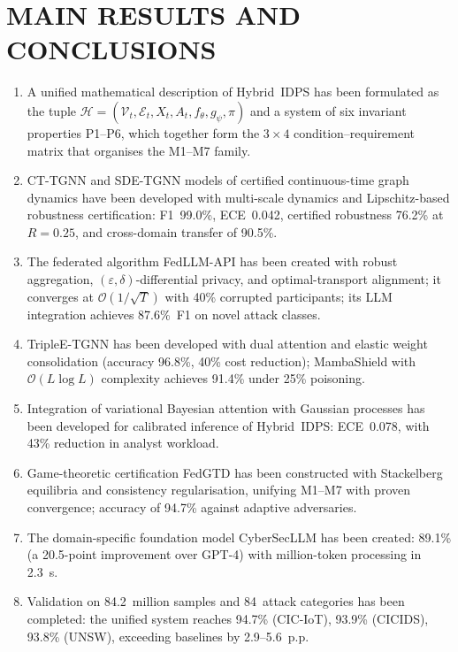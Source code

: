 \documentclass[12pt,a5paper]{article}
\begin{document}
\section*{MAIN RESULTS AND CONCLUSIONS}

\begin{enumerate}
\item A unified mathematical description of Hybrid~IDPS has
been formulated as the tuple
$\mathcal{H} = (\mathcal{V}_t, \mathcal{E}_t, X_t, A_t,
f_\theta, g_\psi, \pi)$ and a system of six invariant
properties P1--P6, which together form the $3\times4$
condition--requirement matrix that organises the M1--M7
family.

\item CT-TGNN and SDE-TGNN models of certified continuous-time
graph dynamics have been developed with multi-scale dynamics
and Lipschitz-based robustness certification: F1~99.0\%,
ECE~0.042, certified robustness 76.2\% at $R{=}0.25$, and
cross-domain transfer of 90.5\%.

\item The federated algorithm FedLLM-API has been created with
robust aggregation, $(\varepsilon,\delta)$-differential
privacy, and optimal-transport alignment; it converges at
$\mathcal{O}(1/\sqrt{T})$ with 40\% corrupted participants;
its LLM integration achieves 87.6\%~F1 on novel attack classes.

\item TripleE-TGNN has been developed with dual attention and
elastic weight consolidation (accuracy 96.8\%, 40\% cost
reduction); MambaShield with $\mathcal{O}(L\log L)$ complexity
achieves 91.4\% under 25\% poisoning.

\item Integration of variational Bayesian attention with
Gaussian processes has been developed for calibrated inference
of Hybrid~IDPS: ECE~0.078, with 43\% reduction in analyst
workload.

\item Game-theoretic certification FedGTD has been constructed
with Stackelberg equilibria and consistency regularisation,
unifying M1--M7 with proven convergence; accuracy of 94.7\%
against adaptive adversaries.

\item The domain-specific foundation model CyberSecLLM has been
created: 89.1\% (a 20.5-point improvement over GPT-4) with
million-token processing in 2.3~s.

\item Validation on 84.2~million samples and 84~attack
categories has been completed: the unified system reaches
94.7\% (CIC-IoT), 93.9\% (CICIDS), 93.8\% (UNSW), exceeding
baselines by 2.9--5.6~p.p.


\end{enumerate}
\end{document}
